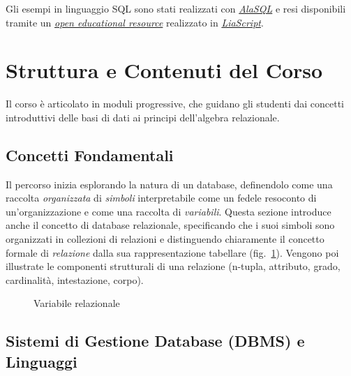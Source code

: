 \documentclass[withtimes]{easychair}
\theoremstyle{definition}
\begin{document}
Gli esempi in linguaggio SQL sono stati realizzati con \href{https://alasql.org/}{\emph{AlaSQL}} e resi disponibili tramite un \href{http://liascript.github.io/course/?https://raw.githubusercontent.com/gionatamassibenincasa/database-didattici/main/algebra_delle_relazioni/README.md}{\emph{open educational resource}} realizzato in \href{https://liascript.github.io/}{\emph{LiaScript}}.

\section{Struttura e Contenuti del Corso}\label{struttura-e-contenuti-del-corso}

Il corso è articolato in moduli progressive, che guidano gli studenti dai concetti introduttivi delle basi di dati ai principi dell'algebra relazionale.

\subsection{Concetti Fondamentali}\label{concetti-fondamentali}

Il percorso inizia esplorando la natura di un database, definendolo come una raccolta \emph{organizzata} di \emph{simboli} interpretabile come un fedele resoconto di un'organizzazione e come una raccolta di \emph{variabili}. Questa sezione introduce anche il concetto di database relazionale, specificando che i suoi simboli sono organizzati in collezioni di relazioni e distinguendo chiaramente il concetto formale di \emph{relazione} dalla sua rappresentazione tabellare (fig.~\ref{fig:variabile}). Vengono poi illustrate le componenti strutturali di una relazione (n-tupla, attributo, grado, cardinalità, intestazione, corpo).

\begin{figure}
    \centering
    
    \caption{Variabile relazionale\label{fig:variabile}}
\end{figure}

\subsection{Sistemi di Gestione Database (DBMS) e Linguaggi}\label{sistemi-di-gestione-database-dbms-e-linguaggi}
\end{document}

